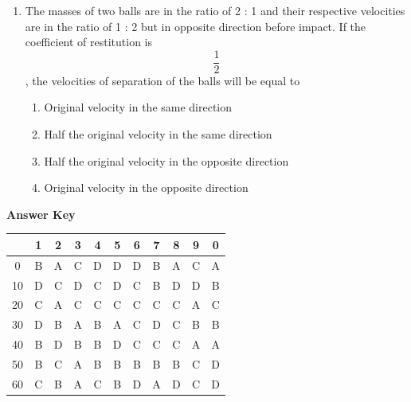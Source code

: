 \documentclass[11pt,a4paper]{article}
\begin{document}
\begin{enumerate}
\item{The masses of two balls are in the ratio of 2 : 1 and their respective velocities are in the ratio of 1 : 2 but in opposite direction before impact. If the coefficient of restitution is $$\frac{1}{2}$$, the velocities of separation of the balls will be equal to
}
\begin{enumerate}[label=\Alph*.]
\item{Original velocity in the same direction}
\item{Half the original velocity in the same direction}
\item{Half the original velocity in the opposite direction}
\item{Original velocity in the opposite direction}
\end{enumerate}
\end{enumerate}
\textbf{Answer Key}
\begin{tabular}{ | c | c c c c c c c c c c | }
\hline
 & 1 & 2 & 3 & 4 & 5 & 6 & 7 & 8 & 9 & 0 \\
\hline
0 & B & A & C & D & D & D & B & A & C & A \\
10 & D & C & D & C & D & C & B & D & D & B \\
20 & C & A & C & C & C & C & C & C & A & C \\
30 & D & B & A & B & A & C & D & C & B & B \\
40 & B & D & B & B & D & C & C & C & A & A \\
50 & B & C & A & B & B & B & B & B & C & D \\
60 & C & B & A & C & B & D & A & D & C & D \\
\hline
\end{tabular}
\clearpage
\end{document}

